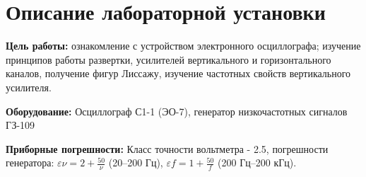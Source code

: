 
\newcommand{\labauthor}{Сарафанов Ф.\,Г.}
\newcommand{\labauthors}{Сарафанов Ф.\,Г.}
\newcommand{\labnumber}{17}
\newcommand{\labtheme}{Осциллограф}


\newcommand{\ddt}{$\ \pm\ 0.2\ \text{с}$}
\newcommand{\ddtv}{$\ \pm\ 0.8\ \text{с}$}
\newcommand{\ddh}{$\ \pm\ 0.1\ \text{см}$}
\newcommand{\dm}{\Delta{}m}
\newcommand{\Dh}{\Delta{}x}
\newcommand{\Dl}{\Delta{}(\lambda)}
\newcommand{\dmsr}{<\Delta{}m>}
\newcommand{\el}{\varepsilon(\lambda)}

\usetikzlibrary{%
    decorations.pathreplacing,%
    decorations.pathmorphing,%
    arrows,%
    patterns
}
\newcommand{\Scale}{1}
\newcommand{\lft}{9}
\newcommand{\rft}{10.43*1.5}
\newcommand{\Xstep}{1.5}
\newcommand{\Ystep}{1.5*20}
\newcommand{\Radius}{0.1}
\newcommand{\Color}{black}

\newcommand{\Tr}{T_\text{р}}
\newcommand{\Ts}{T_\text{с}}


\usepackage{float}





\tableofcontents

\newpage
\section{Описание лабораторной установки}

\textbf{Цель работы:} ознакомление с устройством электронного осциллографа; изучение принципов работы развертки, усилителей вертикального и горизонтального каналов, получение фигур Лиссажу, изучение частотных свойств вертикального усилителя.
\vspace{1.5em}

\textbf{Оборудование:}
Осциллограф С1-1 (ЭО-7), генератор низкочастотных сигналов ГЗ-109
\vspace{1.5em}

\textbf{Приборные погрешности:} Класс точности вольтметра - 2.5, погрешности генератора: $\varepsilon{\nu}=2+\frac{50}{\nu}$ (20--200 Гц), $\varepsilon{f}=1+\frac{50}{f}$ (200 Гц--200 кГц).
\vspace{1.5em}

